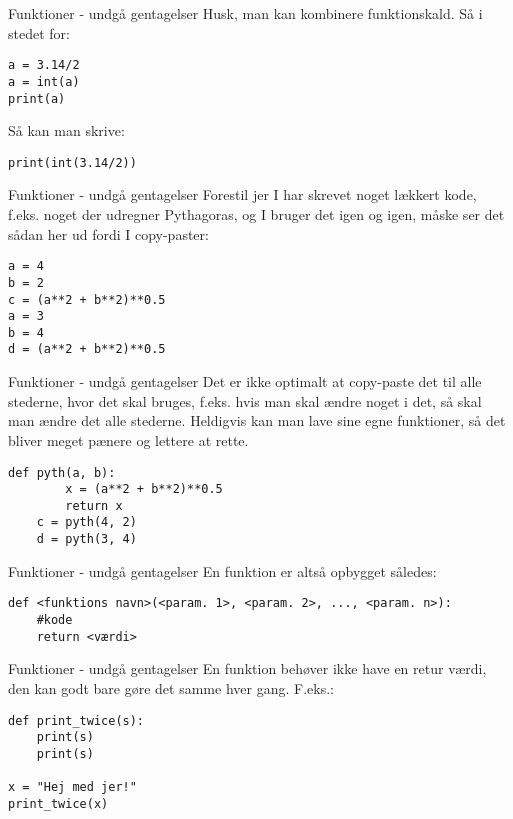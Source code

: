 \documentclass[main.tex]{subfiles}
\begin{document}
\begin{frame}[fragile]{Funktioner - undgå gentagelser}
	Husk, man kan kombinere funktionskald. Så i stedet for:
	
	\begin{lstlisting}[style=python]
a = 3.14/2
a = int(a)
print(a)
	\end{lstlisting}
	
	Så kan man skrive:
	
	\begin{lstlisting}[style=python]
print(int(3.14/2))
	\end{lstlisting}
\end{frame}

\begin{frame}[fragile]{Funktioner - undgå gentagelser}
	Forestil jer I har skrevet noget lækkert kode, f.eks. noget der udregner Pythagoras, og I bruger det igen og igen, måske ser det sådan her ud fordi I copy-paster:
	\begin{lstlisting}[style=python]
a = 4
b = 2
c = (a**2 + b**2)**0.5
a = 3
b = 4
d = (a**2 + b**2)**0.5
	\end{lstlisting}
\end{frame}

\begin{frame}[fragile]{Funktioner - undgå gentagelser}
	Det er ikke optimalt at copy-paste det til alle stederne, hvor det skal bruges, f.eks. hvis man skal ændre noget i det, så skal man ændre det alle stederne. Heldigvis kan man lave sine egne funktioner, så det bliver meget pænere og lettere at rette.
	
	\begin{lstlisting}[style=python]
	def pyth(a, b):
		x = (a**2 + b**2)**0.5
		return x
	c = pyth(4, 2)
	d = pyth(3, 4)
	\end{lstlisting}
\end{frame}

\begin{frame}[fragile]{Funktioner - undgå gentagelser}
	En funktion er altså opbygget således:
	\begin{lstlisting}[style=python]
def <funktions navn>(<param. 1>, <param. 2>, ..., <param. n>):
	#kode
	return <værdi>
	\end{lstlisting}
\end{frame}

\begin{frame}[fragile]{Funktioner - undgå gentagelser}
	En funktion behøver ikke have en retur værdi, den kan godt bare gøre det samme hver gang. F.eks.:
	\begin{lstlisting}[style=python]
def print_twice(s):
	print(s)
	print(s)
	
x = "Hej med jer!"
print_twice(x)
	\end{lstlisting}
\end{frame}
%
\end{document}
